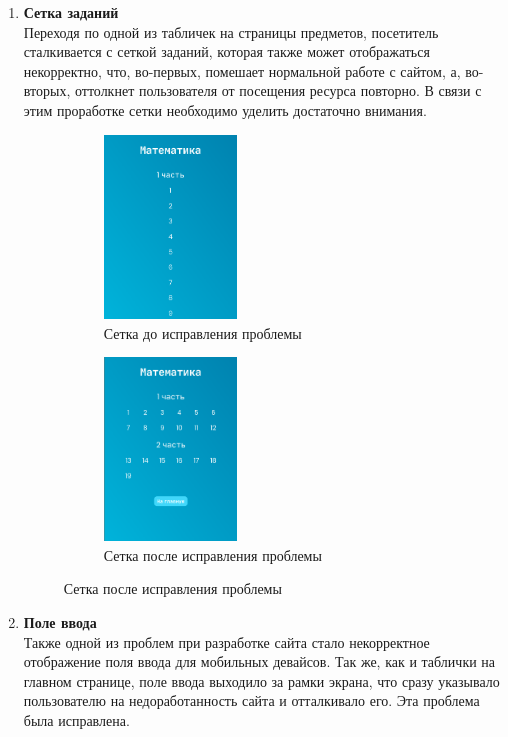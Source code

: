 \documentclass[a4paper, 12pt]{extarticle}
\begin{document}
\begin{enumerate}
    \item{\textbf{Сетка заданий}}\\
    Переходя по одной из табличек на страницы предметов, посетитель
    сталкивается с сеткой заданий, которая также может отображаться
    некорректно, что, во-первых, помешает нормальной работе с сайтом, а,
    во-вторых, оттолкнет пользователя от посещения ресурса повторно. В связи с
    этим проработке сетки необходимо уделить достаточно внимания.
    \begin{figure}[h]
        \begin{subfigure}{.5\textwidth}
            \centering
            \includegraphics[width=100pt]{./img/gridBug.png}
            \caption{Сетка до исправления проблемы}
        \end{subfigure}
        \begin{subfigure}{.5\textwidth}
            \centering
            \includegraphics[width=100pt]{./img/grid.png}
            \caption{Сетка после исправления проблемы}
        \end{subfigure}
    \end{figure}
    \item{\textbf{Поле ввода}}\\
    Также одной из проблем при разработке сайта стало некорректное отображение
    поля ввода для мобильных девайсов. Так же, как и таблички на главном
    странице, поле ввода выходило за рамки экрана, что сразу указывало
    пользователю на недоработанность сайта и отталкивало его. Эта проблема была
    исправлена.
    \begin{figure}[h]

\end{figure}
\end{enumerate}
\end{document}
